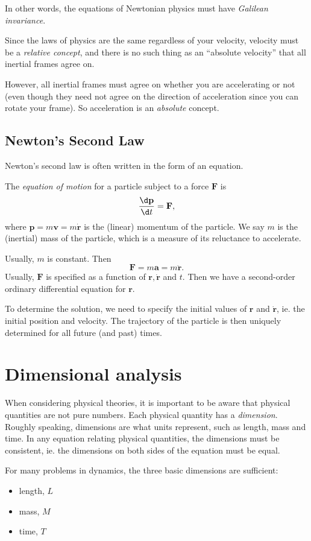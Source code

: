 \documentclass[a4paper]{article}
\begin{document}
In other words, the equations of Newtonian physics must have \emph{Galilean invariance}.

Since the laws of physics are the same regardless of your velocity, velocity must be a \emph{relative concept}, and there is no such thing as an ``absolute velocity'' that all inertial frames agree on.

However, all inertial frames must agree on whether you are accelerating or not (even though they need not agree on the direction of acceleration since you can rotate your frame). So acceleration is an \emph{absolute} concept.

\subsection{Newton's Second Law}
Newton's second law is often written in the form of an equation.
\begin{law}
  The \emph{equation of motion} for a particle subject to a force $\mathbf{F}$ is
  \[
    \frac{\d \mathbf{p}}{\d t} = \mathbf{F},
  \]
  where $\mathbf{p} = m\mathbf{v} = m\dot{\mathbf{r}}$ is the (linear) momentum of the particle. We say $m$ is the (inertial) mass of the particle, which is a measure of its reluctance to accelerate.
\end{law}

Usually, $m$ is constant. Then
\[
  \mathbf{F} = m\mathbf{a} = m\ddot{\mathbf{r}}.
\]
Usually, $\mathbf{F}$ is specified as a function of $\mathbf{r}, \dot{\mathbf{r}}$ and $t$. Then we have a second-order ordinary differential equation for $\mathbf{r}$.

To determine the solution, we need to specify the initial values of $\mathbf{r}$ and $\dot{\mathbf{r}}$, ie. the initial position and velocity. The trajectory of the particle is then uniquely determined for all future (and past) times.

\section{Dimensional analysis}
When considering physical theories, it is important to be aware that physical quantities are not pure numbers. Each physical quantity has a \emph{dimension}. Roughly speaking, dimensions are what units represent, such as length, mass and time. In any equation relating physical quantities, the dimensions must be consistent, ie. the dimensions on both sides of the equation must be equal.

For many problems in dynamics, the three basic dimensions are sufficient:
\begin{itemize}
  \item length, $L$
  \item mass, $M$
  \item time, $T$
\end{itemize}
\end{document}
